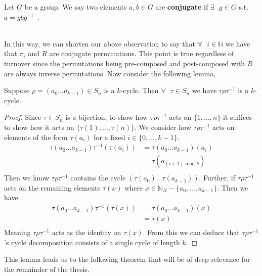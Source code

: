 \begin{definition}
  Let $G$ be a group. We say two elements $a,b\in{G}$ are
  {\bf{conjugate}} if $\exists\text{ }g\in{G}$ s.t. $a=gbg^{-1}$~\cite[p.~50]{artin2011algebra}.
\end{definition}
\text{}\\In this way, we can shorten our above observation to say that
$\forall\text{ }i\in\mathbb{N}$ we have that $\pi_i$ and $R$ are
conjugate permutations. This point is true regardless of turnover
since the permutations being pre-composed and post-composed with $R$
are always inverse permutations. Now consider the following lemma,\\
\begin{lemma}
  Suppose $\rho=(a_0\dots a_{k-1})\in S_n$ is a $k$-cycle. Then
  $\forall\text{ }\tau\in S_n$ we have
  $\tau\rho\tau^{-1}$ is a $k$-cycle.
  \label{conjugate_cycle}
\end{lemma}
\begin{proof}
  Since $\tau\in S_n$ is a bijection, to show how $\tau\rho\tau^{-1}$
  acts on $\{1,\dots, n\}$ it suffices to show how it acts on
  $\{\tau(1), \dots, \tau(n)\}$.
  We consider how $\tau\rho\tau^{-1}$ acts on elements of the form
  $\tau(a_i)$ for a fixed $i\in\{0,\dots,k-1\}$.
  \begin{align*}
    \tau(a_0\dots a_{k-1})\tau^{-1}(\tau(a_i)) & = \tau(a_0\dots
    a_{k-1})(a_i)
    \\
    & = \tau(a_{(i+1)\text{ mod }k}) \\
  \end{align*}
  Then we know $\tau\rho\tau^{-1}$ contains the cycle
  $(\tau(a_0)\dots \tau(a_{k-1}))$.
  Further, if $\tau\rho\tau^{-1}$ acts on the remaining elements
  $\tau(x)$ where $x\in\mathbb{N}_N - \{a_0,\dots,a_{k-1}\}$.
  Then we have
  \begin{align*}
    \tau(a_0\dots a_{k-1})\tau^{-1}(\tau(x)) & = \tau(a_0\dots a_{k-1})(x) \\
    & = \tau(x)                   \\
  \end{align*}
  Meaning $\tau\rho\tau^{-1}$ acts as the identity on $\tau(x)$. From
  this we can deduce that
  $\tau\rho\tau^{-1}$'s cycle decomposition consists of a single
  cycle of length $k$.
\end{proof}

\noindent This lemma leads us to the following theorem that will be of deep
relevance for the remainder of the thesis.

